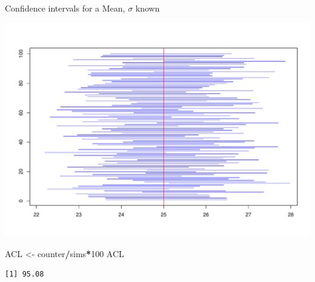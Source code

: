 \documentclass[
  ignorenonframetext,
]{beamer}
\newenvironment{Shaded}{\begin{snugshade}}{\end{snugshade}}
\newcommand{\DecValTok}[1]{\textcolor[rgb]{0.00,0.00,0.81}{#1}}
\newcommand{\NormalTok}[1]{#1}
\newcommand{\OtherTok}[1]{\textcolor[rgb]{0.56,0.35,0.01}{#1}}
\newcommand{\SpecialCharTok}[1]{\textcolor[rgb]{0.81,0.36,0.00}{\textbf{#1}}}
\begin{document}
\begin{frame}[fragile]{Confidence intervals for a Mean, \(\sigma\)
known}
\protect\hypertarget{confidence-intervals-for-a-mean-sigma-known-6}{}
\tiny

\begin{center}\includegraphics[width=0.6\linewidth,height=0.7\textheight]{Week10_Lect_files/figure-beamer/unnamed-chunk-46-1} \end{center}
\normalsize

\tiny

\begin{Shaded}
\begin{Highlighting}[]
\NormalTok{ACL }\OtherTok{\textless{}{-}}\NormalTok{ counter}\SpecialCharTok{/}\NormalTok{sims}\SpecialCharTok{*}\DecValTok{100}
\NormalTok{ACL}
\end{Highlighting}
\end{Shaded}

\begin{verbatim}
[1] 95.08
\end{verbatim}

\normalsize
\end{frame}
\end{document}
